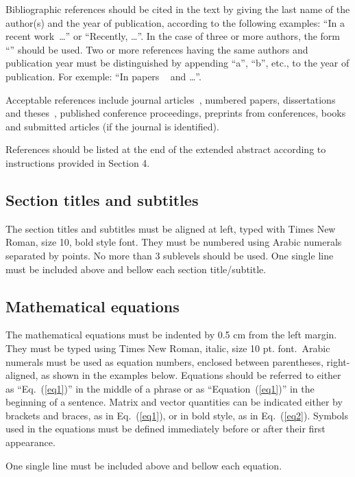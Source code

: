 \documentclass[10pt,fleqn,a4paper,twoside]{article}
\begin{document}
Bibliographic references should be cited in the text by giving the last name of the author(s) and the year of publication, according to the following examples: ``In a recent work~\citep{Miyagi1996}\dots'' or ``Recently, \citet{Xinglong2011}\dots''. In the case of three or more authors, the form ``\citep{Sivcev2018}'' should be used. Two or more references having the same authors and publication year must be distinguished by appending ``a'', ``b'', etc., to the year of publication. For exemple: ``In papers ~\citep{Xinglong2011} and \citep{Xinglong2011}\dots''.

Acceptable references include journal articles~\citet{Villani2004}, numbered papers, dissertations and theses~\citep{Machado2011}, published conference proceedings, preprints from conferences, books~\citep{Miyagi1996} and submitted articles (if the journal is identified).

References should be listed at the end of the extended abstract according to instructions provided in Section 4.

\subsection{Section titles and subtitles}

The section titles and subtitles must be aligned at left, typed with Times New Roman, size 10, bold style font. They must be numbered using Arabic numerals separated by points. No more than 3 sublevels should be used. One single line must be included above and bellow each section title/subtitle.

\subsection{Mathematical equations}

The mathematical equations must be indented by 0.5 cm from the left margin. They must be typed using Times New Roman, italic, size 10 pt. font.\ Arabic numerals must be used as equation numbers, enclosed between parentheses, right-aligned, as shown in the examples below. Equations should be referred to either as ``Eq.~(\ref{eq1})'' in the middle of a phrase or as ``Equation~(\ref{eq1})'' in the beginning of a sentence. Matrix and vector quantities can be indicated either by brackets and braces, as in Eq.~(\ref{eq1}), or in bold style, as in Eq.~(\ref{eq2}). Symbols used in the equations must be defined immediately before or after their first appearance.

One single line must be included above and bellow each equation.
\end{document}
